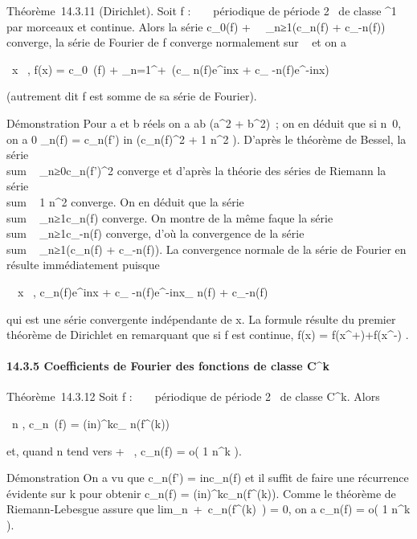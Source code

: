 \documentclass[]{article}
\begin{document}
Théorème~14.3.11 (Dirichlet). Soit f : ~ \rightarrow~  périodique de période 2\pi~ de
classe ^1 par morceaux et continue. Alors la série
c_0(f) +\
\sum ~
_n≥1(c_n(f) +
c_-n(f)) converge, la série de Fourier de f
converge normalement sur ~ et on a

\forall~x \in {}~, f(x) = c_0~(f) +
\sum _n=1^+\infty~(c_
n(f)e^inx + c_ -n(f)e^-inx)

(autrement dit f est somme de sa série de Fourier).

Démonstration Pour a et b réels on a ab  
(a^2 + b^2)~; on en déduit que si
n\neq~0, on a 0
\leqc_n(f) = \left 
c_n(f') \over in \right
{} 
(c_n(f)^2 + 1
\over n^2 ). D'après le théorème de Bessel,
la série \\sum ~
_n≥0c_n(f')^2 converge et
d'après la théorie des séries de Riemann la série
\\sum ~  1
\over n^2 converge. On en déduit que la
série \\sum ~
_n≥1c_n(f) converge. On montre de la
même fa\ccon que la série
\\sum ~
_n≥1c_-n(f) converge, d'où la
convergence de la série
\\sum ~
_n≥1(c_n(f) +
c_-n(f)). La convergence normale de la
série de Fourier en résulte immédiatement puisque

\forall~~x \in {}~,
c_n(f)e^inx + c_
-n(f)e^-inx\leqc_ n(f)
+ c_-n(f)

qui est une série convergente indépendante de x. La formule résulte du
premier théorème de Dirichlet en remarquant que si f est continue, f(x)
= f(x^+)+f(x^-) \over 2 .

\paragraph{14.3.5 Coefficients de Fourier des fonctions de classe
C^k}

Théorème~14.3.12 Soit f : ~ \rightarrow~  périodique de période 2\pi~ de classe
C^k. Alors

\forall~n \in {}, c_n~(f) =
(in)^kc_ n(f^(k))

et, quand n tend vers + \infty~, c_n(f) = o( 1
\over n^k ).

Démonstration On a vu que c_n(f') = inc_n(f) et il
suffit de faire une récurrence évidente sur k pour obtenir
c_n(f) = (in)^kc_n(f^(k)). Comme
le théorème de Riemann-Lebesgue assure que
lim_n\rightarrow~+\infty~c_n(f^(k)~)
= 0, on a c_n(f) = o( 1 \over n^k
).
\end{document}
